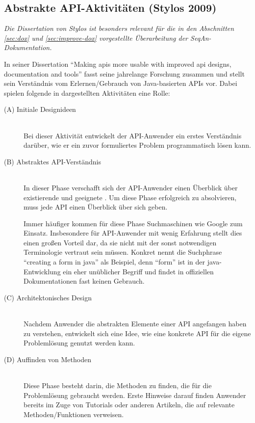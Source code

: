 \subsection{Abstrakte API-Aktivitäten (Stylos 2009)}

\begin{important}
\textit{Die Dissertation von Stylos ist besonders relevant für die in den Abschnitten \ref{sec:dox} und \ref{sec:improve-dox} vorgestellte Überarbeitung der SeqAn-Dokumentation.}

In seiner Dissertation ``Making apis more usable with improved api designs, documentation and tools'' fasst \cite{Stylos:2009ts} seine jahrelange Forschung zusammen und stellt sein Verständnis vom Erlernen/Gebrauch von Java-basierten APIs vor. Dabei spielen folgende in  dargestellten Aktivitäten eine Rolle:

\begin{description}
  \item[(A) Initiale Designideen] \hfill \\
  Bei dieser Aktivität entwickelt der API-Anwender ein erstes Verständnis darüber, wie er ein zuvor formuliertes Problem programmatisch lösen kann.

  \item[(B) Abstraktes API-Verständnis] \hfill \\
  In dieser Phase verschafft sich der API-Anwender einen Überblick über existierende und geeignete . Um diese Phase erfolgreich zu absolvieren, muss jede API einen Überblick über sich geben.
  
  Immer häufiger kommen für diese Phase Suchmaschinen wie Google zum Einsatz. Insbesondere für API-Anwender mit wenig Erfahrung stellt dies einen großen Vorteil dar, da sie nicht mit der sonst notwendigen Terminologie vertraut sein müssen. Konkret nennt \cite{Stylos:2009ts} die Suchphrase  ``creating a form in java'' als Beispiel, denn ``form'' ist in der \gls{java}-Entwicklung ein eher unüblicher Begriff und findet in offiziellen Dokumentationen fast keinen Gebrauch.
  
  \item[(C) Architektonisches Design] \hfill \\
  Nachdem Anwender die abstrakten Elemente einer API angefangen haben zu verstehen, entwickelt sich eine Idee, wie eine konkrete API für die eigene Problemlösung genutzt werden kann.
  
  \item[(D) Auffinden von Methoden] \hfill \\
  Diese Phase besteht darin, die Methoden zu finden, die für die Problemlösung gebraucht werden. Erste Hinweise darauf finden Anwender bereits im Zuge von Tutorials oder anderen Artikeln, die auf relevante Methoden/Funktionen verweisen.
  

\end{description}
\end{important}

